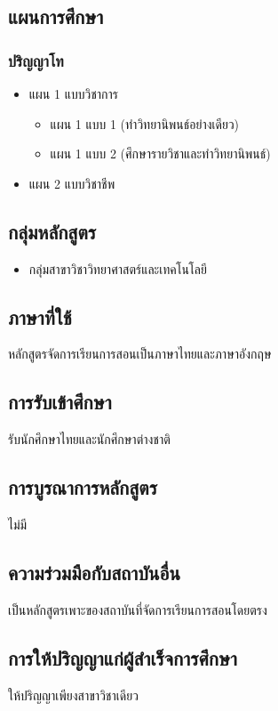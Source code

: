 \subsection{แผนการศึกษา}
\subsubsection*{ปริญญาโท}
\begin{itemize}
	\item แผน 1 แบบวิชาการ
		\begin{itemize}
		\item แผน 1 แบบ 1 (ทำวิทยานิพนธ์อย่างเดียว)
		\item แผน 1 แบบ 2 (ศึกษารายวิชาและทำวิทยานิพนธ์)
		\end{itemize}
	\item แผน 2 แบบวิชาชีพ
\end{itemize}

\subsection{กลุ่มหลักสูตร}
\begin{itemize}
	\item กลุ่มสาขาวิชาวิทยาศาสตร์และเทคโนโลยี
\end{itemize}


\subsection{ภาษาที่ใช้}
หลักสูตรจัดการเรียนการสอนเป็นภาษาไทยและภาษาอังกฤษ

\subsection{การรับเข้าศึกษา}
รับนักศึกษาไทยและนักศึกษาต่างชาติ

\subsection{การบูรณาการหลักสูตร}
ไม่มี

\subsection{ความร่วมมือกับสถาบันอื่น}
เป็นหลักสูตรเพาะของสถาบันที่จัดการเรียนการสอนโดยตรง

\subsection{การให้ปริญญาแก่ผู้สำเร็จการศึกษา}
ให้ปริญญาเพียงสาขาวิชาเดียว




























